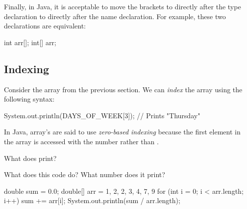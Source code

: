 Finally, in Java, it is acceptable to move the brackets to directly after the type declaration to directly after the name declaration. For example, these two declarations are equivalent:

\begin{code}
int arr[];
int[] arr;
\end{code}

\subsection{Indexing}

Consider the array  from the previous section. We can \emph{index} the array using the following syntax:

\begin{code}
System.out.println(DAYS_OF_WEEK[3]);  // Prints "Thursday"
\end{code}

In Java, array's are said to use \emph{zero-based indexing} because the first element in the array is accessed with the number  rather than .

\begin{example}
What does  print?
\end{example}

\begin{example}
What does this code do? What number does it print?

\begin{code}
double sum = 0.0;
double[] arr = { 1, 2, 2, 3, 4, 7, 9 }
for (int i = 0; i < arr.length; i++) {
    sum += arr[i];
}
System.out.println(sum / arr.length);
\end{code}
\end{example}






